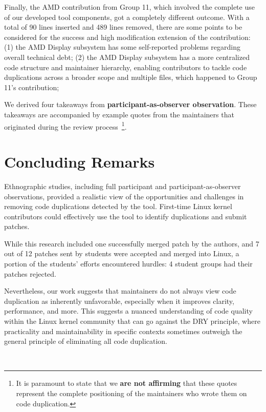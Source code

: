 \documentclass[10pt,conference]{IEEEtran}
\begin{document}
Finally, the AMD contribution from Group 11, which involved the complete use of our developed tool components, got a completely different outcome. With a total of 90 lines inserted and 489 lines removed, there are some points to be considered for the success and high modification extension of the contribution: (1) the AMD Display subsystem has some self-reported problems regarding overall technical debt; (2) the AMD Display subsystem has a more centralized code structure and maintainer hierarchy, enabling contributors to tackle code duplications across a broader scope and multiple files, which happened to Group 11's contribution;

We derived four takeaways from \textbf{participant-as-observer observation}. These takeaways are accompanied by example quotes from the maintainers that originated during the review process~\footnote{It is paramount to state that we \textbf{are not affirming} that these quotes represent the complete positioning of the maintainers who wrote them on code duplication.}.


\section{Concluding Remarks}

Ethnographic studies, including full participant and participant-as-observer observations, provided a realistic view of the opportunities and challenges in removing code duplications detected by the tool. First-time Linux kernel contributors could effectively use the tool to identify duplications and submit patches.

While this research included one successfully merged patch by the authors, and 7 out of 12 patches sent by students were accepted and merged into Linux, a portion of the students' efforts encountered hurdles: 4 student groups had their patches rejected.

Nevertheless, our work suggests that maintainers do not always view code duplication as inherently unfavorable, especially when it improves clarity, performance, and more. This suggests a nuanced understanding of code quality within the Linux kernel community that can go against the DRY principle, where practicality and maintainability in specific contexts sometimes outweigh the general principle of eliminating all code duplication.

\hfill\\
\end{document}
